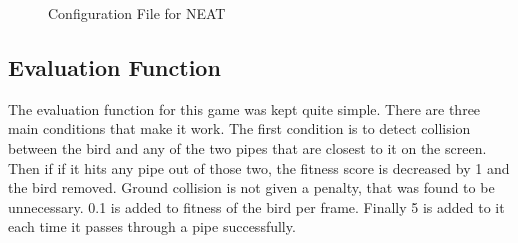 \documentclass[conference]{IEEEtran}
\begin{document}
\begin{figure}[htbp]
\caption{Configuration File for NEAT}
\label{fig6}
\end{figure}

\subsection{Evaluation Function}

The evaluation function for this game was kept quite simple. There are three main conditions that make it work. The first condition is to detect collision between the bird and any of the two pipes that are closest to it on the screen. Then if if it hits any pipe out of those two, the fitness score is decreased by 1 and the bird removed. Ground collision is not given a penalty, that was found to be unnecessary. 0.1 is added to fitness of the bird per frame. Finally 5 is added to it each time it passes through a pipe successfully.
\end{document}

